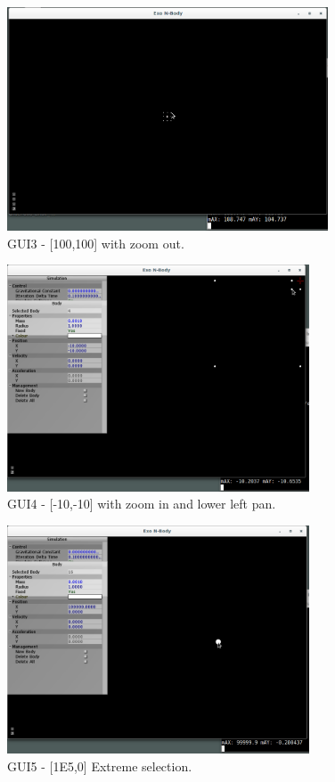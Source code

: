 \begin{figure}[H]
  \centering
  \includegraphics[width=0.85\textwidth]{img/testingEvidence/gui3_3.png}
  \caption{GUI3 - [100,100] with zoom out.}
\end{figure}

\begin{figure}[H]
  \centering
  \includegraphics[width=0.8\textwidth]{img/testingEvidence/gui4.png}
  \caption{GUI4 - [-10,-10] with zoom in and lower left pan.}
\end{figure}

\begin{figure}[H]
  \centering
  \includegraphics[width=0.8\textwidth]{img/testingEvidence/gui5.png}
  \caption{GUI5 - [1E5,0] Extreme selection.}
\end{figure}

